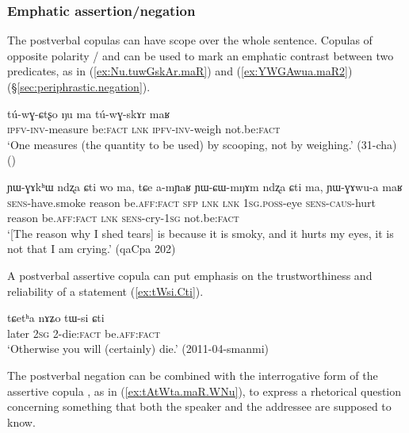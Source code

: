  
\subsubsection{Emphatic assertion/negation} \label{sec:affirmative.copula.function}
The postverbal copulas can have scope over the whole sentence. Copulas of opposite polarity / and  can be used to mark an emphatic contrast between two predicates, as in (\ref{ex:Nu.tuwGskAr.maR}) and (\ref{ex:YWGAwua.maR2}) (§\ref{sec:periphrastic.negation}).

\begin{exe}
\ex \label{ex:Nu.tuwGskAr.maR}
\gll  tú-wɣ-ɕtʂo ŋu ma tú-wɣ-skɤr maʁ \\
\textsc{ipfv}-\textsc{inv}-measure be:\textsc{fact} \textsc{lnk} \textsc{ipfv}-\textsc{inv}-weigh not.be:\textsc{fact} \\
\glt `One measures (the quantity to be used) by scooping, not by weighing.' (31-cha)
()
\end{exe}

\begin{exe}
\ex \label{ex:YWGAwua.maR2}
\gll ɲɯ-ɣɤkʰɯ ndʐa ɕti wo ma, tɕe a-mɲaʁ ɲɯ-ɕɯ-mŋɤm ndʐa ɕti ma, ɲɯ-ɣɤwu-a maʁ \\
\textsc{sens}-have.smoke reason be.\textsc{aff}:\textsc{fact} \textsc{sfp} \textsc{lnk} \textsc{lnk} \textsc{1sg}.\textsc{poss}-eye \textsc{sens}-\textsc{caus}-hurt reason be.\textsc{aff}:\textsc{fact} \textsc{lnk} \textsc{sens}-cry-\textsc{1sg} not.be:\textsc{fact} \\
\glt `[The reason why I shed tears] is because it is smoky, and it hurts my eyes, it is not that I am crying.' (qaCpa 202)
\end{exe}

A postverbal assertive copula can put emphasis on the trustworthiness and reliability of a statement  (\ref{ex:tWsi.Cti}).

\begin{exe}
\ex \label{ex:tWsi.Cti}
\gll  tɕetʰa nɤʑo tɯ-si ɕti \\
later \textsc{2sg} 2-die:\textsc{fact} be.\textsc{aff}:\textsc{fact} \\
\glt `Otherwise you will (certainly) die.' (2011-04-smanmi)
\end{exe}

The postverbal negation  can be combined with the interrogative form of the assertive copula , as in (\ref{ex:tAtWta.maR.WNu}), to express a rhetorical question concerning something that both the speaker and the addressee are supposed to know.

